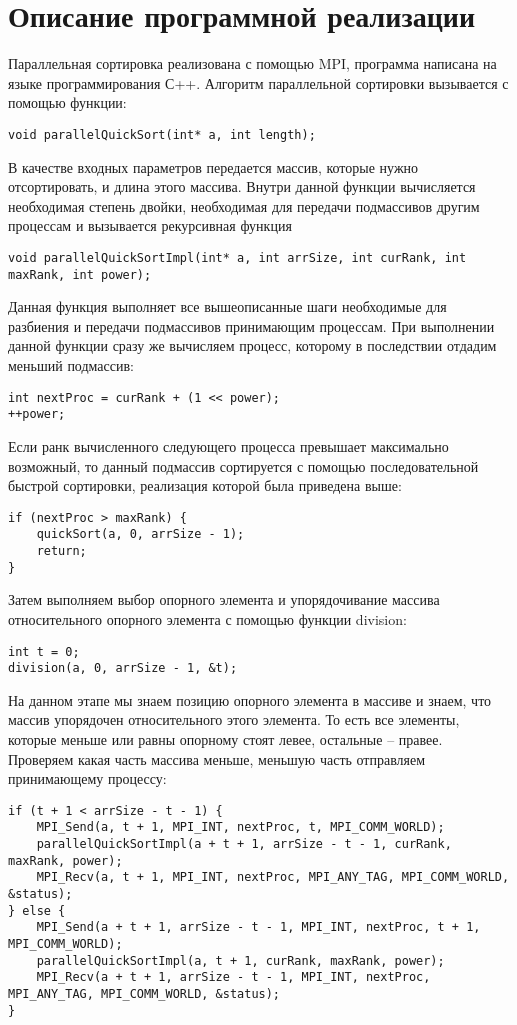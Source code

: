 \documentclass{report}
\begin{document}
\section*{Описание программной реализации}
Параллельная сортировка реализована с помощью MPI, программа написана на языке программирования С++. Алгоритм параллельной сортировки вызывается с помощью функции:
\begin{lstlisting}
void parallelQuickSort(int* a, int length);
\end{lstlisting}
\par В качестве входных параметров передается массив, которые нужно отсортировать, и длина этого массива. Внутри данной функции вычисляется необходимая степень двойки, необходимая для передачи подмассивов другим процессам и вызывается рекурсивная функция
\begin{lstlisting}
void parallelQuickSortImpl(int* a, int arrSize, int curRank, int maxRank, int power);
\end{lstlisting}
\par Данная функция выполняет все вышеописанные шаги необходимые для разбиения и передачи подмассивов принимающим процессам. При выполнении данной функции сразу же вычисляем процесс, которому в последствии отдадим меньший подмассив:
\begin{lstlisting}
int nextProc = curRank + (1 << power);
++power;
\end{lstlisting}
Если ранк вычисленного следующего процесса превышает максимально возможный, то данный подмассив сортируется с помощью последовательной быстрой сортировки, реализация которой была приведена выше:
\begin{lstlisting}
if (nextProc > maxRank) {
    quickSort(a, 0, arrSize - 1);
    return;
}
\end{lstlisting}
Затем выполняем выбор опорного элемента и упорядочивание массива относительного опорного элемента с помощью функции division:
\begin{lstlisting}
int t = 0;
division(a, 0, arrSize - 1, &t);
\end{lstlisting}
На данном этапе мы знаем позицию опорного элемента в массиве и знаем, что массив упорядочен относительного этого элемента. То есть все элементы, которые меньше или равны опорному стоят левее, остальные -- правее. Проверяем какая часть массива меньше, меньшую часть отправляем принимающему процессу:
\begin{lstlisting}
if (t + 1 < arrSize - t - 1) {
    MPI_Send(a, t + 1, MPI_INT, nextProc, t, MPI_COMM_WORLD);
    parallelQuickSortImpl(a + t + 1, arrSize - t - 1, curRank, maxRank, power);
    MPI_Recv(a, t + 1, MPI_INT, nextProc, MPI_ANY_TAG, MPI_COMM_WORLD, &status);
} else {
    MPI_Send(a + t + 1, arrSize - t - 1, MPI_INT, nextProc, t + 1, MPI_COMM_WORLD);
    parallelQuickSortImpl(a, t + 1, curRank, maxRank, power);
    MPI_Recv(a + t + 1, arrSize - t - 1, MPI_INT, nextProc, MPI_ANY_TAG, MPI_COMM_WORLD, &status);
}
\end{lstlisting}
\end{document}
